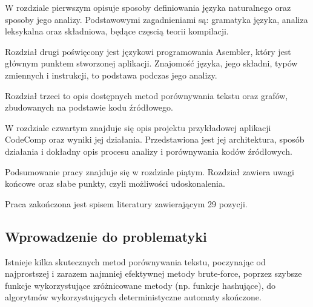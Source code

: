 \documentclass[a4paper,12pt]{article}
\begin{document}
W rozdziale pierwszym opisuje sposoby definiowania języka naturalnego oraz sposoby jego analizy. Podstawowymi zagadnieniami są: gramatyka języka, analiza leksykalna oraz składniowa, będące częscią teorii kompilacji.

Rozdział drugi poświęcony jest językowi programowania Asembler, który jest głównym punktem stworzonej aplikacji. Znajomość języka, jego składni, typów zmiennych i instrukcji, to podstawa podczas jego analizy.

Rozdział trzeci to opis dostępnych metod porównywania tekstu oraz grafów, zbudowanych na podstawie kodu źródłowego.

W rozdziale czwartym znajduje się opis projektu przykładowej aplikacji CodeComp oraz wyniki jej działania. Przedstawiona jest jej architektura, sposób działania i dokładny opis procesu analizy i porównywania kodów źródłowych.

Podsumowanie pracy znajduje się w rozdziale piątym. Rozdział zawiera uwagi końcowe oraz słabe punkty, czyli możliwości udoskonalenia.

Praca zakończona jest spisem literatury zawierającym 29 pozycji.
\newpage
\subsection{Wprowadzenie do problematyki}

Istnieje kilka skutecznych metod porównywania tekstu, poczynając od najprostszej i zarazem najmniej efektywnej metody brute-force, poprzez szybsze funkcje wykorzystujące zróżnicowane metody (np. funkcje hashujące), do algorytmów wykorzystujących deterministyczne automaty skończone.
\end{document}
